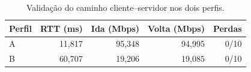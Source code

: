 \begin{table}[htbp]
	\centering
	\caption{Validação do caminho cliente--servidor nos dois perfis.}
	\label{tab:validacao}
	\begin{tabular}{lrrrr}
		\toprule
		Perfil & RTT (ms) & Ida (Mbps) & Volta (Mbps) & Perdas \\
		\midrule
		A & 11,817 & 95,348 & 94,995 & 0/10 \\
		B & 60,707 & 19,206 & 19,085 & 0/10 \\
		\bottomrule
	\end{tabular}
\end{table}
